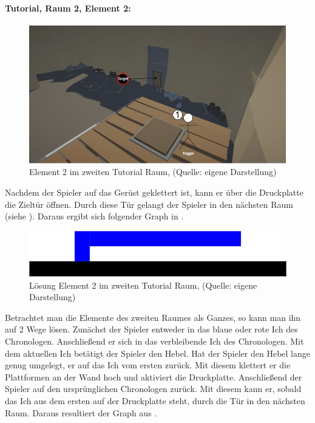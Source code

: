 \newpage

\paragraph{Tutorial, Raum 2, Element 2:}

\begin{figure}[ht]
\centering
\includegraphics[width=0.8\linewidth]{content/pictures/Raetsel-L01_R02_R02.jpg}
\caption{Element 2 im zweiten Tutorial Raum, (Quelle: eigene Darstellung)}
\label{fig:L01_R02_R02}
\end{figure}

Nachdem der Spieler auf das Gerüst geklettert ist, kann er über die Druckplatte die Zieltür öffnen. Durch diese Tür gelangt der Spieler in den nächsten Raum (siehe ). Daraus ergibt sich folgender Graph in .

\begin{figure}[ht]
\centering
\includegraphics[width=0.8\linewidth]{content/pictures/Raetsel-L01_R02_R02_Loesung.jpg}
\caption{Lösung Element 2 im zweiten Tutorial Raum, (Quelle: eigene Darstellung)}
\label{fig:L01_R02_R02_L}
\end{figure}

Betrachtet man die Elemente des zweiten Raumes als Ganzes, so kann man ihn auf 2 Wege lösen. Zunächst  der Spieler entweder in das blaue oder rote Ich des Chronologen. Anschließend  er sich in das verbleibende Ich des Chronologen. Mit dem aktuellen Ich betätigt der Spieler den Hebel. Hat der Spieler den Hebel lange genug umgelegt,  er auf das Ich vom ersten  zurück. Mit diesem klettert er die Plattformen an der Wand hoch und aktiviert die Druckplatte. Anschließend  der Spieler auf den ursprünglichen Chronologen zurück. Mit diesem kann er, sobald das Ich aus dem ersten  auf der Druckplatte steht, durch die Tür in den nächsten Raum. Daraus resultiert der Graph aus .

